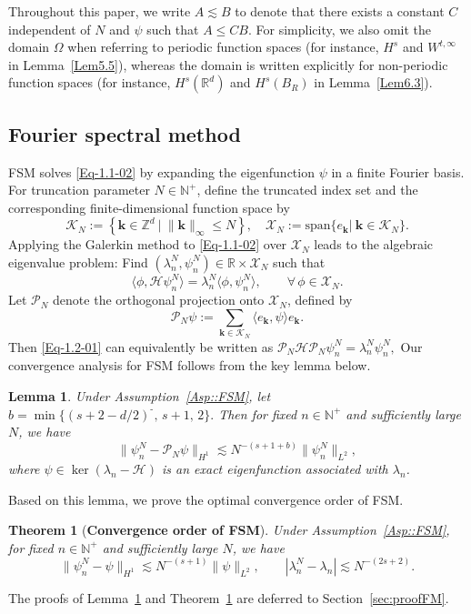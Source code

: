 \documentclass{sn-jnl}%
\newcommand{\m}{\textbf{-}}
\numberwithin{equation}{section}
\theoremstyle{thmstyleone}%
\newtheorem{theorem}{Theorem}%
\newtheorem{lemma}{Lemma}[section]%
\theoremstyle{thmstyletwo}%
\theoremstyle{thmstylethree}%
\begin{document}
Throughout this paper,  we write $A \lesssim B$ to denote that there exists a constant $C$ independent of $N$ and $\psi$ such that $A \le C B$.  
For simplicity, we also omit the domain $\Omega$ when referring to periodic function spaces (for instance, $H^s$ and $W^{t,\infty}$ in Lemma~\ref{Lem5.5}), whereas the domain is written explicitly for non-periodic function spaces (for instance, $H^s(\mathbb{R}^d)$ and $H^s(B_R)$ in Lemma~\ref{Lem6.3}).

\subsection{Fourier spectral method}
\label{subsec:FM}
FSM solves \eqref{Eq-1.1-02} by expanding the eigenfunction $\psi$ in a finite Fourier basis. 
For truncation parameter $N \in \mathbb{N}^+$, define the truncated index set and the corresponding finite-dimensional function space by
\[\mathscr{K}_N := \left\{ \bm k\in \mathbb{Z}^d\ | \ \| \bm k \|_{\infty}\leq N\right\},\quad \mathscr{X}_N:=\text{span}\{ e_{\bm k}|\ \bm k\in \mathscr{K}_N\}.\] 
Applying the Galerkin method to \eqref{Eq-1.1-02} over $\mathscr{X}_N$
leads to the algebraic eigenvalue problem: Find 
$(\lambda_n^N,\psi_n^N)\in \mathbb{R}\times \mathscr{X}_N$ such that
\begin{equation}
\label{Eq-1.2-01}
    \langle \phi, \mathcal{H}\psi_n^N\rangle
    = \lambda_n^N \langle \phi,\psi_n^N\rangle,
    \qquad \forall\, \phi \in \mathscr{X}_N.
\end{equation}
Let $\mathcal{P}_N$ denote the orthogonal projection onto $\mathscr{X}_N$, defined by
\[
\mathcal{P}_N \psi
:= \sum_{\bm k \in \mathscr{K}_N}
\langle e_{\bm k},\psi\rangle e_{\bm k}.
\]
Then \eqref{Eq-1.2-01} can equivalently be written as
$
\mathcal{P}_N \mathcal{H} \mathcal{P}_N \psi_n^N
=
\lambda_n^N \psi_n^N,
$
Our convergence analysis for FSM follows from the key lemma below.
\begin{lemma}\label{Lem1.1}
Under Assumption~\ref{Asp::FSM}, let
$
b = \min\{(s+2-d/2)^{\m},\, s+1,\, 2\}.
$
Then for fixed $n \in \mathbb{N}^+$ and sufficiently large $N$, we have 
\begin{equation}
\|\psi_n^N - \mathcal{P}_N \psi\|_{H^1}
\lesssim N^{-(s+1+b)}
\|\psi_n^N\|_{L^2},
\end{equation}
where $\psi \in \operatorname{ker}(\lambda_n - \mathcal{H})$ is an exact eigenfunction associated with $\lambda_n$.
\end{lemma}
Based on this lemma, we prove the optimal convergence order of FSM.
\begin{theorem}[\textbf{Convergence order of FSM}] \label{Thm01}
Under Assumption~\ref{Asp::FSM}, for fixed $n \in \mathbb{N}^+$ and sufficiently large $N$, we have
\begin{equation}
\|\psi_n^N - \psi\|_{H^1} \lesssim N^{-(s+1)}\|\psi\|_{L^2},\qquad |\lambda_n^N - \lambda_n| \lesssim N^{-(2s+2)}.
\end{equation}
\end{theorem}
The proofs of Lemma~\ref{Lem1.1} and Theorem~\ref{Thm01} are deferred to Section~\ref{sec:proofFM}.
\end{document}

